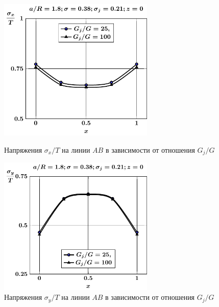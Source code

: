 \begin{figure}[h!]
\centering\footnotesize
\parbox[b]{7.5cm}{\centering\includegraphics[width=7.4cm]{inc5-g-a18-sig_x.pdf}
\caption{Напряжения $\sigma_x/T$ на линии $AB$ в зависимости от отношения $G_j/G$
\label{f:7:142}}}\hfil\hfil
\parbox[b]{7.5cm}{\centering\includegraphics[width=7.4cm]{inc5-g-a18-sig_y.pdf}
\caption{Напряжения $\sigma_y/T$ на линии $AB$ в зависимости от отношения $G_j/G$
\label{f:7:143}}}
\end{figure}

